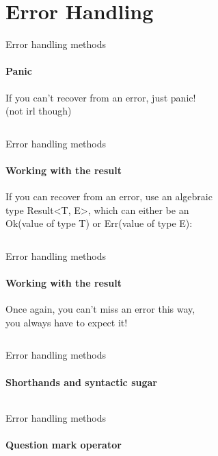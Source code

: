 \documentclass[usenames,dvipsnames,10pt,aspectratio=169]{beamer}
\begin{document}

\section{Error Handling}

\begin{frame}{Error handling methods}
	\framesubtitle{Panic}
\large
If you can't recover from an error, just \textcolor{ucuyellow}{panic!}\\
(not irl though)
\vspace{0.9cm}
\inputminted[fontsize=\Large]{rust}{code/error1.rs}
\normalsize
\end{frame}

\begin{frame}{Error handling methods}
\framesubtitle{Working with the result}

\normalsize
If you can recover from an error, use an algebraic\\
type \textcolor{ucuyellow}{Result<T, E>}, which can either be an\\
\textcolor{ucuyellow}{Ok(value of type T)} or 
\textcolor{ucuyellow}{Err(value of type E)}:
\vspace{0.2cm}
\inputminted[fontsize=\Large]{rust}{code/error2.rs}
\vspace{0.55cm}
\end{frame}

\begin{frame}{Error handling methods}
\framesubtitle{Working with the result}
\large
Once again, you can't miss an error this way,\\
you always have to expect it!
\vspace{0.2cm}
\inputminted[fontsize=\Large]{rust}{code/error3.rs}
\vspace{0.55cm}
\end{frame}

\begin{frame}{Error handling methods}
\framesubtitle{Shorthands and syntactic sugar}
\normalsize
\inputminted[fontsize=\Large]{rust}{code/error4.rs}
\end{frame}

\begin{frame}{Error handling methods}
\framesubtitle{Question mark operator}
\inputminted[fontsize=\large]{rust}{code/error5.rs}
\vspace{0.5cm}
\end{frame}
\end{document}
